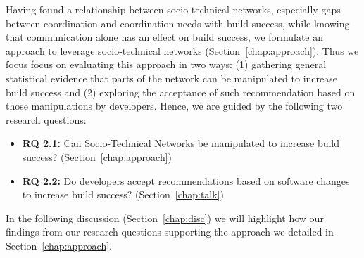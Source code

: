 Having found a relationship between socio-technical networks, especially gaps between coordination and coordination needs with build success, while knowing that communication alone has an effect on build success, we formulate an approach to leverage socio-technical networks (Section~\ref{chap:approach}).
Thus we focus focus on evaluating this approach in two ways:
(1) gathering general statistical evidence that parts of the network can be manipulated to increase build success and
(2) exploring the acceptance of such recommendation based on those manipulations by developers.
Hence, we are guided by the following two research questions:

\begin{itemize}
  \item\textbf{RQ 2.1:} Can Socio-Technical Networks be manipulated to increase build success? (Section~\ref{chap:approach})
  \item\textbf{RQ 2.2:} Do developers accept recommendations based on software changes to increase build success? (Section~\ref{chap:talk})
\end{itemize}

In the following discussion (Section~\ref{chap:disc}) we will highlight how our findings from our research questions supporting the approach we detailed in Section~\ref{chap:approach}.









